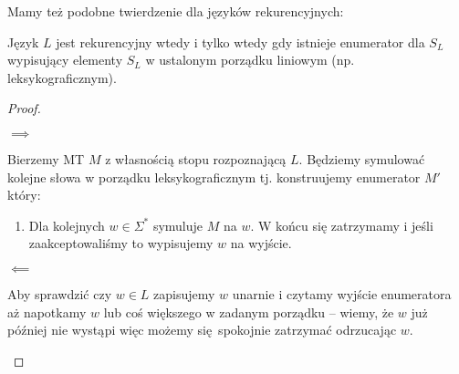 Mamy też podobne twierdzenie dla języków rekurencyjnych:
\begin{theorem}
      Język \( L \) jest rekurencyjny wtedy i tylko wtedy gdy istnieje enumerator dla \( S_L \) wypisujący elementy \( S_L \) w ustalonym porządku liniowym (np. leksykograficznym). 
\end{theorem}
\begin{proof}
    \begin{description}
        \item \( \implies \)
        
        Bierzemy MT \( M \) z własnością stopu rozpoznającą \( L \).
        Będziemy symulować kolejne słowa w porządku leksykograficznym tj. konstruujemy enumerator \( M' \) który:
        \begin{enumerate}
            \item Dla kolejnych \( w \in \Sigma^* \) symuluje \( M \) na \( w \).
            W końcu się zatrzymamy i jeśli zaakceptowaliśmy to wypisujemy \( w \) na wyjście.
        \end{enumerate}
        
        \item \( \impliedby \)
        
        Aby sprawdzić czy \( w \in L \) zapisujemy \( w \) unarnie i czytamy wyjście enumeratora aż napotkamy \( w \) lub coś większego w zadanym porządku -- wiemy, że \( w \) już później nie wystąpi więc możemy się spokojnie zatrzymać odrzucając \( w \).
        
    \end{description}
\end{proof}